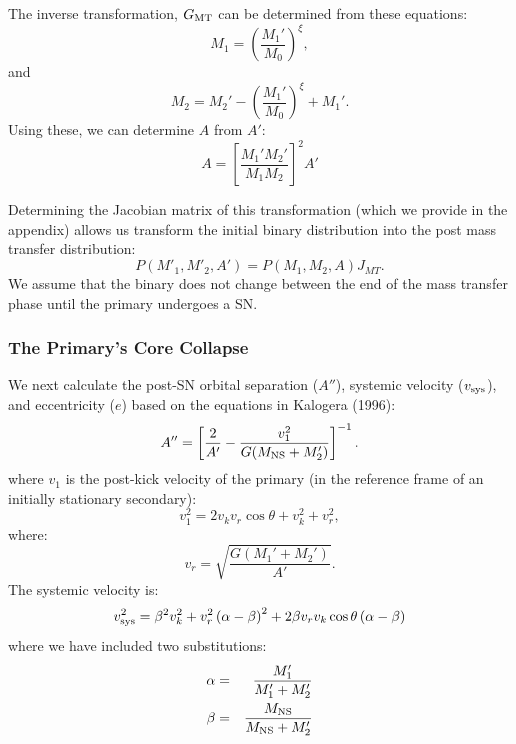 \documentclass[12pt, preprint]{aastex}
\begin{document}
The inverse transformation, $G_{\rm MT}$ can be determined from these equations:
\begin{equation}
M_1 = \left( \frac{M_1'}{M_0} \right)^{\xi}, 
\end{equation}
and
\begin{equation}
M_2 = M_2' - \left( \frac{M_1'}{M_0} \right)^{\xi} + M_1'.
\end{equation}
Using these, we can determine $A$ from $A'$:
\begin{equation}
A = \left[ \frac{M_1' M_2'}{M_1 M_2} \right]^2 A'
\end{equation}



Determining the Jacobian matrix of this transformation (which we provide in the appendix) allows us transform the initial binary distribution into the post mass transfer distribution:
\begin{equation}
P(M'_1, M'_2, A') = P(M_1, M_2, A) J_{MT}. \label{eq:P_MT}
\end{equation}
We assume that the binary does not change between the end of the mass transfer phase until the primary undergoes a SN. 




\subsubsection{The Primary's Core Collapse} \label{sec:trans_SN}

We next calculate the post-SN orbital separation ($A''$), systemic velocity ($v_{\rm sys}$), and eccentricity ($e$) based on the equations in Kalogera (1996):
\begin{equation}
A'' = \left[ \frac{2 }{A'}  - \frac{v_1^2}{G(M_{\rm NS} + M_2')} \right]^{-1}. \label{eq:SN_A} \\
\end{equation}
where $v_1$ is the post-kick velocity of the primary (in the reference frame of an initially stationary secondary):
\begin{equation}
v_1^2 = 2v_k v_r \cos \theta + v_k^2 + v_r^2, \label{eq:v_1}
\end{equation}
where:
\begin{equation}
v_r = \sqrt{\frac{G (M_1' + M_2')}{A'}}. \label{eq:v_r}
\end{equation}
The systemic velocity is:
\begin{equation}
v_{\rm sys}^2 = \beta^2 v_k^2
   + v_r^2 \left( \alpha - \beta \right)^2
   + 2 \beta v_r v_k \cos \theta \left( \alpha - \beta \right)
    \label{eq:SN_v_sys}
\end{equation}
where we have included two substitutions:
\begin{eqnarray}
\alpha &=& \frac{M_1'}{M_1' + M_2'} \\
\beta &=& \frac{M_{\rm NS}}{M_{\rm NS} + M_2'}
\end{eqnarray}
\end{document}
